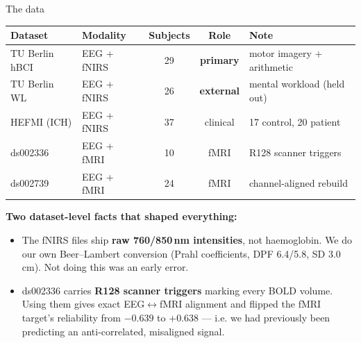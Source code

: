 \documentclass[aspectratio=169,11pt]{beamer}
\begin{document}
\begin{frame}{The data}
\begin{center}\small
\begin{tabular}{llccl}
\toprule
Dataset & Modality & Subjects & Role & Note \\
\midrule
TU Berlin hBCI & EEG + fNIRS & 29 & \textbf{primary} & motor imagery + arithmetic \\
TU Berlin WL   & EEG + fNIRS & 26 & \textbf{external} & mental workload (held out) \\
HEFMI (ICH)    & EEG + fNIRS & 37 & clinical & 17 control, 20 patient \\
ds002336       & EEG + fMRI  & 10 & fMRI     & R128 scanner triggers \\
ds002739       & EEG + fMRI  & 24 & fMRI     & channel-aligned rebuild \\
\bottomrule
\end{tabular}
\end{center}

\vspace{0.8em}
\textbf{Two dataset-level facts that shaped everything:}
\begin{itemize}
  \item The fNIRS files ship \textbf{raw 760/850\,nm intensities}, not
        haemoglobin. We do our own Beer--Lambert conversion (Prahl coefficients,
        DPF 6.4/5.8, SD 3.0\,cm). Not doing this was an early error.
  \item ds002336 carries \textbf{R128 scanner triggers} marking every BOLD
        volume. Using them gives exact EEG$\leftrightarrow$fMRI alignment and
        flipped the fMRI target's reliability from $-0.639$ to $+0.638$ --- i.e.
        we had previously been predicting an anti-correlated, misaligned signal.
\end{itemize}
\end{frame}
\end{document}
